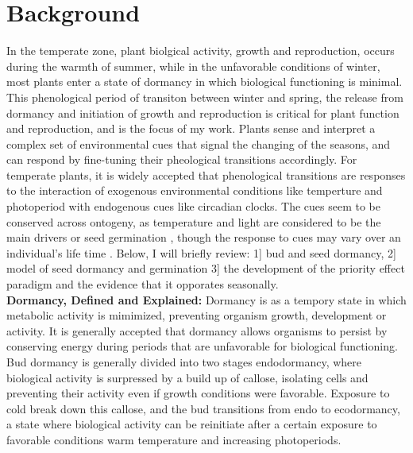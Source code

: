 \documentclass{article}\usepackage[]{graphicx}\usepackage[]{color}
\begin{document}
\section*{Background}
 In the temperate zone, plant biolgical activity, growth and reproduction, occurs during the warmth of summer, while in the unfavorable conditions of winter, most plants enter a state of dormancy in which biological functioning is minimal. This phenological period of transiton between winter and spring, the release from dormancy and initiation of growth and reproduction is critical for plant function and reproduction, and is the focus of my work. Plants sense and interpret a complex set of environmental cues that signal the changing of the seasons, and can respond by fine-tuning their pheological transitions accordingly. For temperate plants, it is widely accepted that phenological transitions are responses to the interaction of exogenous environmental conditions like temperture and photoperiod with endogenous cues like circadian clocks. The cues seem to be conserved across ontogeny, as temperature and light are considered to be the main drivers or seed germination \citep{}, though the response to cues may vary over an individual's life time \citep{}. Below, I will briefly review: 1] bud and seed dormancy, 2] model of seed dormancy and germination 3] the development of the priority effect paradigm and the evidence that it opporates seasonally.\\
\ident\textbf{Dormancy, Defined and Explained:} Dormancy is as a tempory state in which metabolic activity is mimimized, preventing organism growth, development or activity. It is generally accepted that dormancy allows organisms to persist by conserving energy during periods that are unfavorable for biological functioning\citep{}. Bud dormancy  is generally divided into two stages endodormancy, where biological activity is surpressed by a build up of callose, isolating cells and preventing their activity even if growth conditions were favorable. Exposure to cold break down this callose, and the bud transitions from endo to ecodormancy, a state where biological activity can be reinitiate  after a certain exposure to favorable conditions warm temperature and increasing photoperiods.\\
\end{document}

